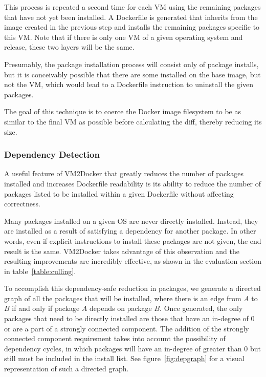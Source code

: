 This process is repeated a second time for each VM using the remaining packages that have not yet been installed. A Dockerfile is generated that inherits from the image created in the previous step and installs the remaining packages specific to this VM. Note that if there is only one VM of a given operating system and release, these two layers will be the same.

Presumably, the package installation process will consist only of package installs, but it is conceivably possible that there are some installed on the base image, but not the VM, which would lead to a Dockerfile instruction to uninstall the given packages.

The goal of this technique is to coerce the Docker image filesystem to be as similar to the final VM as possible before calculating the diff, thereby reducing its size.

\subsubsection{Dependency Detection}
\label{sec:depdetection}
A useful feature of VM2Docker that greatly reduces the number of packages installed and increases Dockerfile readability is its ability to reduce the number of packages listed to be installed within a given Dockerfile without affecting correctness.

Many packages installed on a given OS are never directly installed. Instead, they are installed as a result of satisfying a dependency for another package. In other words, even if explicit instructions to install these packages are not given, the end result is the same. VM2Docker takes advantage of this observation and the resulting improvements are incredibly effective, as shown in the evaluation section in table~\ref{table:culling}.

To accomplish this dependency-safe reduction in packages, we generate a directed graph of all the packages that will be installed, where there is an edge from $A$ to $B$ if and only if package $A$ depends on package $B$. Once generated, the only packages that need to be directly installed are those that have an in-degree of 0 or are a part of a strongly connected component. The addition of the strongly connected component requirement takes into account the possibility of dependency cycles, in which packages will have an in-degree of greater than 0 but still must be included in the install list. See figure~\ref{fig:depgraph} for a visual representation of such a directed graph.

